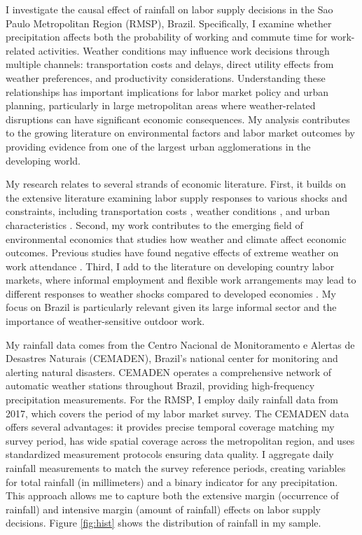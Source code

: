 I investigate the causal effect of rainfall on labor supply decisions in the Sao Paulo Metropolitan Region (RMSP), Brazil. Specifically, I examine whether precipitation affects both the probability of working and commute time for work-related activities. Weather conditions may influence work decisions through multiple channels: transportation costs and delays, direct utility effects from weather preferences, and productivity considerations. Understanding these relationships has important implications for labor market policy and urban planning, particularly in large metropolitan areas where weather-related disruptions can have significant economic consequences. My analysis contributes to the growing literature on environmental factors and labor market outcomes by providing evidence from one of the largest urban agglomerations in the developing world.

My research relates to several strands of economic literature. First, it builds on the extensive literature examining labor supply responses to various shocks and constraints, including transportation costs \citep{zenou2001}, weather conditions \citep{connolly2008JLaborEcon}, and urban characteristics \citep{moretti2011local}. Second, my work contributes to the emerging field of environmental economics that studies how weather and climate affect economic outcomes. Previous studies have found negative effects of extreme weather on work attendance \citep{somanathan2021impact}. Third, I add to the literature on developing country labor markets, where informal employment and flexible work arrangements may lead to different responses to weather shocks compared to developed economies \citep{branco2021AmericanJAgriEconomics}. My focus on Brazil is particularly relevant given its large informal sector and the importance of weather-sensitive outdoor work.

My rainfall data comes from the Centro Nacional de Monitoramento e Alertas de Desastres Naturais (CEMADEN), Brazil's national center for monitoring and alerting natural disasters. CEMADEN operates a comprehensive network of automatic weather stations throughout Brazil, providing high-frequency precipitation measurements. For the RMSP, I employ daily rainfall data from 2017, which covers the period of my labor market survey. The CEMADEN data offers several advantages: it provides precise temporal coverage matching my survey period, has wide spatial coverage across the metropolitan region, and uses standardized measurement protocols ensuring data quality. I aggregate daily rainfall measurements to match the survey reference periods, creating variables for total rainfall (in millimeters) and a binary indicator for any precipitation. This approach allows me to capture both the extensive margin (occurrence of rainfall) and intensive margin (amount of rainfall) effects on labor supply decisions. Figure \ref{fig:hist} shows the distribution of rainfall in my sample.

